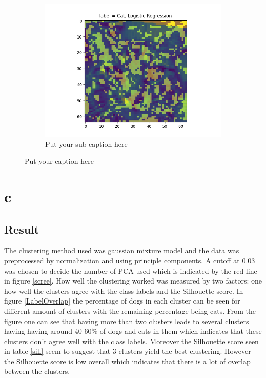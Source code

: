 \documentclass{article}
\begin{document}
\begin{figure}[ht]
\begin{subfigure}{.33\textwidth}
  \includegraphics[width=1\linewidth]{1b/Imp_feat LogReg.png}  
  \caption{Put your sub-caption here}
  \label{fig:sub-second}
\end{subfigure}
\caption{Put your caption here}
\label{imp pixels}
\end{figure}
\newpage
\section{c}
\subsection{Result}
The clustering method used was gaussian mixture model and the data was preprocessed by normalization and using principle components. A cutoff at 0.03 was chosen to decide the number of PCA used which is indicated by the red line in figure \ref{scree}. How well the clustering worked was measured by two factors: one how well the clusters agree with the class labels and the Silhouette score. In figure \ref{LabelOverlap} the percentage of dogs in each cluster can be seen for different amount of clusters with the remaining percentage being cats. From the figure one can see that having more than two clusters leads to several clusters having having around 40-60\% of dogs and cats in them which indicates that these clusters don't agree well with the class labels. Moreover the Silhouette score seen in table \ref{sill} seem to suggest that 3 clusters yield the best clustering. However the Silhouette score is low overall which indicates that there is a lot of overlap between the clusters.      
\end{document}
